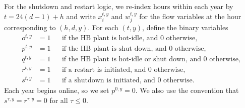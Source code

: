 \documentclass[11pt, letter]{article}
\begin{document}
For the shutdown and restart logic, we re-index hours within each year by $t=24(d-1)+h$ and write $x_i^{t,y}$ and $w_j^{t,y}$ for the flow variables at the hour corresponding to $(h,d,y)$. For each $(t,y)$, define the binary variables
\[
\begin{aligned}
o^{t,y} &= 1 && \text{if the HB plant is hot-idle, and 0 otherwise},\\
p^{t,y} &= 1 && \text{if the HB plant is shut down, and 0 otherwise},\\
q^{t,y} &= 1 && \text{if the HB plant is hot-idle or shut down, and 0 otherwise},\\
r^{t,y} &= 1 && \text{if a restart is initiated, and 0 otherwise},\\
s^{t,y} &= 1 && \text{if a shutdown is initiated, and 0 otherwise}.
\end{aligned}
\]
Each year begins online, so we set $p^{0,y}=0$. We also use the convention that $s^{\tau,y}=r^{\tau,y}=0$ for all $\tau\le 0$.
\end{document}
